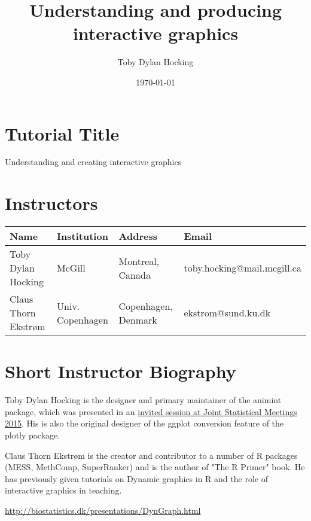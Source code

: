 \documentclass[11pt]{article}
\author{Toby Dylan Hocking}
\date{\today}
\title{Understanding and producing interactive graphics}
\begin{document}



\section{Tutorial Title}
\label{sec:orgheadline2}

Understanding and creating interactive graphics

\section{Instructors}
\label{sec:orgheadline3}

\begin{center}
\begin{tabular}{llll}
Name & Institution & Address & Email\\
\hline
Toby Dylan Hocking & McGill & Montreal, Canada & toby.hocking@mail.mcgill.ca\\
Claus Thorn Ekstrøm & Univ. Copenhagen & Copenhagen, Denmark & ekstrom@sund.ku.dk\\
\end{tabular}
\end{center}

\section{Short Instructor Biography}
\label{sec:orgheadline4}

Toby Dylan Hocking is the designer and primary maintainer of the
animint package, which was presented in an \href{https://www.amstat.org/meetings/jsm/2015/onlineprogram/AbstractDetails.cfm?abstractid=314184\%0A}{invited session at Joint
Statistical Meetings 2015}. His is also the original designer of the
ggplot conversion feature of the plotly package.

Claus Thorn Ekstrøm is the creator and contributor to a number of R
packages (MESS, MethComp, SuperRanker) and is the author of "The R
Primer" book. He has previously given tutorials on Dynamic
graphics in R and the role of interactive graphics in teaching.

\url{http://biostatistics.dk/presentations/DynGraph.html}
\end{document}
